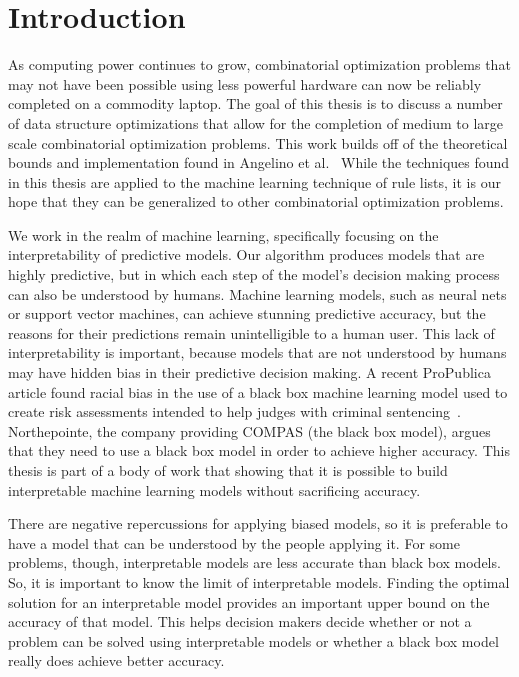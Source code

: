 \chapter{Introduction}
\label{introduction}
As computing power continues to grow, combinatorial optimization problems that may not have been possible using less powerful hardware can now be reliably completed on a commodity laptop.
The goal of this thesis is to discuss a number of data structure optimizations that allow for the completion of medium to large scale combinatorial optimization problems.
This work builds off of the theoretical bounds and implementation found in Angelino et al.~\cite{AngelinoLaAlSeRu17}
While the techniques found in this thesis are applied to the machine learning technique of rule lists, it is our hope that they can be generalized to other combinatorial optimization problems.

We work in the realm of machine learning, specifically focusing on the interpretability of predictive models.
Our algorithm produces models that are highly predictive, but in which each step of the model's decision making process can also be understood by humans.
Machine learning models, such as neural nets or support vector machines, can achieve stunning predictive accuracy, but the reasons for their predictions remain unintelligible to a human user.
This lack of interpretability is important, because models that are not understood by humans may have hidden bias in their predictive decision making.
A recent ProPublica article found racial bias in the use of a black box machine learning model used to create risk assessments intended to help judges with criminal sentencing~\cite{LarsonMaKiAn16}.
Northepointe, the company providing COMPAS (the black box model), argues that they need to use a black box model in order to achieve higher accuracy.
This thesis is part of a body of work that showing that it is possible to build interpretable machine learning models without sacrificing accuracy.

There are negative repercussions for applying biased models, so it is preferable to have a model that can be understood by the people applying it.
For some problems, though, interpretable models are less accurate than black box models.
So, it is important to know the limit of interpretable models.
Finding the optimal solution for an interpretable model provides an important upper bound on the accuracy of that model.
This helps decision makers decide whether or not a problem can be solved using interpretable models or whether a black box model really does achieve better accuracy.

